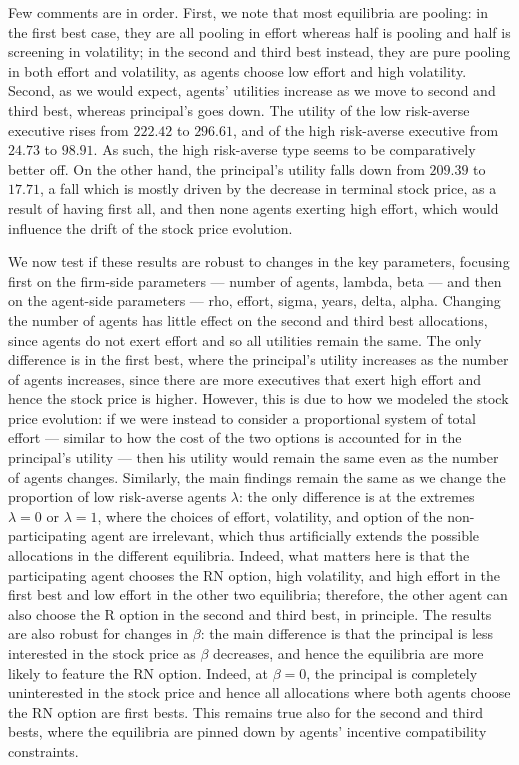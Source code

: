 Few comments are in order. First, we note that most equilibria are pooling: in the first best case, they are all pooling in effort whereas half is pooling and half is screening in volatility; in the second and third best instead, they are pure pooling in both effort and volatility, as agents choose low effort and high volatility. Second, as we would expect, agents' utilities increase as we move to second and third best, whereas principal's goes down. The utility of the low risk-averse executive rises from $222.42$ to $296.61$, and of the high risk-averse executive from $24.73$ to $98.91$. As such, the high risk-averse type seems to be comparatively better off. On the other hand, the principal's utility falls down from $209.39$ to $17.71$, a fall which is mostly driven by the decrease in terminal stock price, as a result of having first all, and then none agents exerting high effort, which would influence the drift of the stock price evolution.

We now test if these results are robust to changes in the key parameters, focusing first on the firm-side parameters --- number of agents, lambda, beta --- and then on the agent-side parameters --- rho, effort, sigma, years, delta, alpha.
Changing the number of agents has little effect on the second and third best allocations, since agents do not exert effort and so all utilities remain the same. The only difference is in the first best, where the principal's utility increases as the number of agents increases, since there are more executives that exert high effort and hence the stock price is higher. However, this is due to how we modeled the stock price evolution: if we were instead to consider a proportional system of total effort --- similar to how the cost of the two options is accounted for in the principal's utility --- then his utility would remain the same even as the number of agents changes. Similarly, the main findings remain the same as we change the proportion of low risk-averse agents $\lambda$: the only difference is at the extremes $\lambda = 0$ or $\lambda = 1$, where the choices of effort, volatility, and option of the non-participating agent are irrelevant, which thus artificially extends the possible allocations in the different equilibria. Indeed, what matters here is that the participating agent chooses the RN option, high volatility, and high effort in the first best and low effort in the other two equilibria; therefore, the other agent can also choose the R option in the second and third best, in principle. The results are also robust for changes in $\beta$: the main difference is that the principal is less interested in the stock price as $\beta$ decreases, and hence the equilibria are more likely to feature the RN option. Indeed, at $\beta = 0$, the principal is completely uninterested in the stock price and hence all allocations where both agents choose the RN option are first bests. This remains true also for the second and third bests, where the equilibria are pinned down by agents' incentive compatibility constraints.

